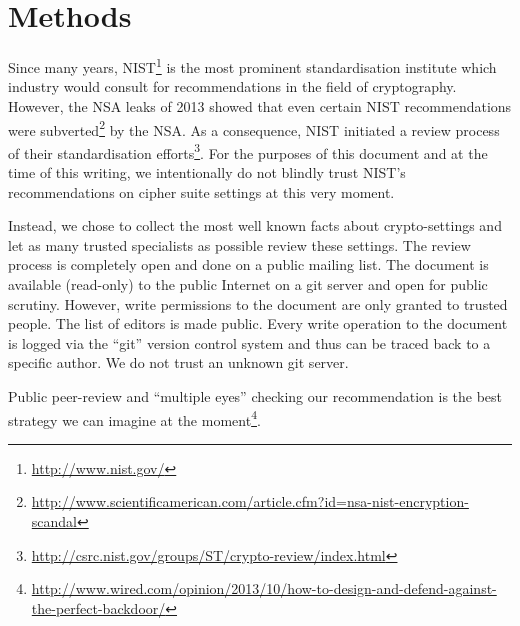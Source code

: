 \section{Methods}
\label{section:Methods}

Since many years, NIST\footnote{\url{http://www.nist.gov/}} is the most
prominent standardisation institute which industry would consult for
recommendations in the field of cryptography. However, the NSA leaks of 2013
showed that even certain NIST recommendations were
subverted\footnote{\url{http://www.scientificamerican.com/article.cfm?id=nsa-nist-encryption-scandal}}
by the NSA.  As a consequence, NIST initiated a review process of their
standardisation
efforts\footnote{\url{http://csrc.nist.gov/groups/ST/crypto-review/index.html}}.
For the purposes of this document and at the time of this writing, we
intentionally do not blindly trust NIST's recommendations on cipher suite
settings at this very moment. 

Instead, we chose to collect the most well known facts about crypto-settings
and let as many trusted specialists as possible review these settings.  The
review process is completely open and done on a public mailing list. The
document is available (read-only) to the public Internet on a git server and
open for public scrutiny. However, write permissions to the document are only
granted to trusted people. The list of editors is made public.  Every write
operation to the document is logged via the ``git'' version control system and
thus can be traced back to a specific author.  We do not trust an unknown git
server. 

Public peer-review and  ``multiple eyes'' checking our recommendation is the best
strategy we can imagine at the moment\footnote{\url{http://www.wired.com/opinion/2013/10/how-to-design-and-defend-against-the-perfect-backdoor/}}.


